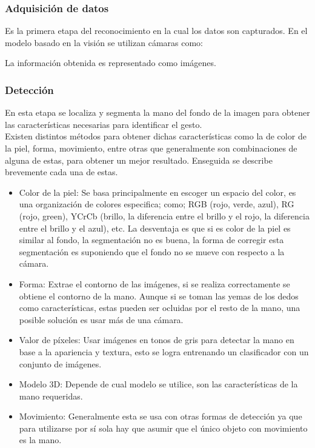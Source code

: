 \subsubsection{Adquisición de datos}\label{sssec:EtapaAdquisicion}

Es la primera etapa del reconocimiento en la cual los datos son capturados. En el modelo basado en la visión se utilizan cámaras como: 

La información obtenida es representado como imágenes. 

\subsubsection{Detección}\label{sssec:EtapaDeteccion}

En esta etapa se localiza y segmenta la mano del fondo de la imagen para obtener las características necesarias para identificar el gesto.\\
Existen distintos métodos para obtener dichas características como la de color de la piel, forma, movimiento, entre otras que generalmente son combinaciones de alguna de estas, para obtener un mejor resultado. Enseguida se describe brevemente cada una de estas.  
\begin{itemize}
\item Color de la piel: Se basa principalmente en escoger un espacio del color, es una organización de colores especifica; como; RGB (rojo, verde, azul), RG (rojo, green), YCrCb (brillo, la diferencia entre el brillo y el rojo, la diferencia entre el brillo y el azul), etc. La desventaja es que si es color de la piel es similar al fondo, la segmentación no es buena, la forma de corregir esta segmentación es suponiendo que el fondo no se mueve con respecto a la cámara.
\item Forma: Extrae el contorno de las imágenes, si se realiza correctamente se obtiene el contorno de la mano. Aunque si se toman las yemas de los dedos como características, estas pueden ser ocluidas por el resto de la mano, una posible solución es usar más de una cámara.  
\item Valor de p\'ixeles: Usar imágenes en tonos de gris para detectar la mano en base a la apariencia y textura, esto se logra entrenando un clasificador con un conjunto de imágenes.
\item Modelo 3D: Depende de cual modelo se utilice, son las características de la mano requeridas. 
\item Movimiento: Generalmente esta se usa con otras formas de detección ya que para utilizarse por sí sola hay que asumir que el único objeto con movimiento es la mano.
\end{itemize} 

